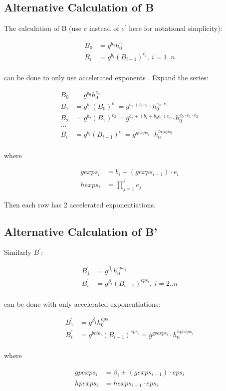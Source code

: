 \documentclass{article}
\begin{document}
\pagebreak
\subsection*{Alternative Calculation of B}

The calculation of B (use $e$ instead of $e^{\prime}$ here for notational simplicity):

\begin{align*}
B_{0} &= g^{b_0} h_0^{e_{0}} \\
B_i & =g^{b_{i}}(B_{i-1})^{e_{i}},\ i=1..n \\
\end{align*}

can be done to only use accelerated exponents . Expand the series:

\begin{align*}
B_0 &= g^{b_0} h_0^{e_{0}} \\
B_1 & = g^{b_1}(B_0)^{e_1} = g^{b_1 + b_0 e_1} \cdot h_0^{e_0 \cdot e_1} \\
B_2 & = g^{b_2}(B_1)^{e_2} = g^{b_2 + (b_1 + b_0 e_1) e_2} \cdot h_0^{e_0 \cdot e_1 \cdot e_2} \\
... \\
B_i & = g^{b_i}(B_{i-1})^{e_i} = g^{gexps_i} \cdot h_0^{hexps_i} \\
\end{align*}

where

\begin{align*}
gexps_i &= b_i + (gexps_{i-1}) \cdot e_i \\
hexps_i &= \prod_{j=1}^{i} e_j
\end{align*}

Then each row has 2 accelerated exponentiations.

\subsection*{Alternative Calculation of B'}

Similarly $B^{\prime}$:

\begin{align*}
B_{1}^{\prime} &= g^{\beta_1} h_0^{eps_1} \\
B_{i}^{\prime} &= g^{\beta_{i}}(B_{i-1})^{eps_{i}},\ i=2..n \\
\end{align*}

can be done with only accelerated exponentiations:

\begin{align*}
B_1^{\prime} &= g^{\beta_1} h_0^{eps_1} \\
B_i^{\prime} &= g^{beta_i}(B_{i-1})^{eps_i} = g^{gpexps_i} \cdot h_0^{hpexps_i} \\
\end{align*}

where

\begin{align*}
gpexps_i &= \beta_i + (gexps_{i-1}) \cdot eps_i \\
hpexps_i &= hexps_{i-1} \cdot eps_i
\end{align*}
\end{document}
